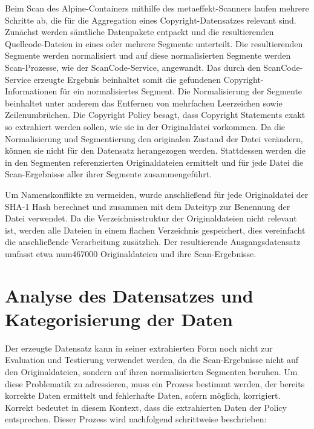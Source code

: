 Beim Scan des Alpine-Containers mithilfe des metaeffekt-Scanners laufen mehrere Schritte ab, die für die Aggregation eines Copyright-Datensatzes relevant sind.
Zunächst werden sämtliche Datenpakete entpackt und die resultierenden Quellcode-Dateien in eines oder mehrere Segmente unterteilt.
Die resultierenden Segmente werden normalisiert und auf diese normalisierten Segmente werden Scan-Prozesse, wie der ScanCode-Service, angewandt.
Das durch den ScanCode-Service erzeugte Ergebnis beinhaltet somit die gefundenen Copyright-Informationen für ein normalisiertes Segment.
Die Normalisierung der Segmente beinhaltet unter anderem das Entfernen von mehrfachen Leerzeichen sowie Zeilenumbrüchen.
Die Copyright Policy besagt, dass Copyright Statements exakt so extrahiert werden sollen, wie sie in der Originaldatei vorkommen.
Da die Normalisierung und Segmentierung den originalen Zustand der Datei verändern, können sie nicht für den Datensatz herangezogen werden.
Stattdessen werden die in den Segmenten referenzierten Originaldateien ermittelt und für jede Datei die Scan-Ergebnisse aller ihrer Segmente zusammengeführt.

Um Namenskonflikte zu vermeiden, wurde anschließend für jede Originaldatei der SHA-1 Hash berechnet und zusammen mit dem Dateityp zur Benennung der Datei verwendet.
Da die Verzeichnisstruktur der Originaldateien nicht relevant ist, werden alle Dateien in einem flachen Verzeichnis gespeichert, dies vereinfacht die anschließende Verarbeitung zusätzlich.
Der resultierende Ausgangsdatensatz umfasst etwa num{467000} Originaldateien und ihre Scan-Ergebnisse.

\section{Analyse des Datensatzes und Kategorisierung der Daten}\label{sec:analyse-datensatz}

Der erzeugte Datensatz kann in seiner extrahierten Form noch nicht zur Evaluation und Testierung verwendet werden, da die Scan-Ergebnisse nicht auf den Originaldateien, sondern auf ihren normalisierten Segmenten beruhen.
Um diese Problematik zu adressieren, muss ein Prozess bestimmt werden, der bereits korrekte Daten ermittelt und fehlerhafte Daten, sofern möglich, korrigiert.
Korrekt bedeutet in diesem Kontext, dass die extrahierten Daten der Policy entsprechen.
Dieser Prozess wird nachfolgend schrittweise beschrieben:

